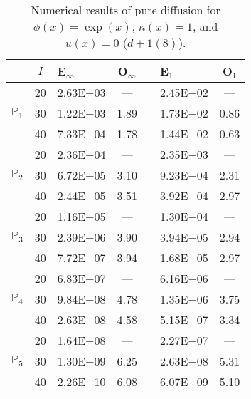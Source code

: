 \begin{table}[H]
\centering
\caption{Numerical results of pure diffusion for $\phi(x)=\exp(x)$, $\kappa(x)=1$, and $u(x)=0$ ($d+1(8)$).}
\begin{tabular}{@{}l c l c c l c@{}}
\toprule
 & $I$ & E$_{\infty}$ & O$_{\infty}$ && E$_1$ & O$_1$\\
\midrule
\multirow{3}{*}{$\mathbb{P}_{1}$}
 & 20 & 2.63E$-$03 & --- && 2.45E$-$02 & ---\\
 & 30 & 1.22E$-$03 & 1.89 && 1.73E$-$02 & 0.86\\
 & 40 & 7.33E$-$04 & 1.78 && 1.44E$-$02 & 0.63\\
\midrule
\multirow{3}{*}{$\mathbb{P}_{2}$}
 & 20 & 2.36E$-$04 & --- && 2.35E$-$03 & ---\\
 & 30 & 6.72E$-$05 & 3.10 && 9.23E$-$04 & 2.31\\
 & 40 & 2.44E$-$05 & 3.51 && 3.92E$-$04 & 2.97\\
\midrule
\multirow{3}{*}{$\mathbb{P}_{3}$}
 & 20 & 1.16E$-$05 & --- && 1.30E$-$04 & ---\\
 & 30 & 2.39E$-$06 & 3.90 && 3.94E$-$05 & 2.94\\
 & 40 & 7.72E$-$07 & 3.94 && 1.68E$-$05 & 2.97\\
\midrule
\multirow{3}{*}{$\mathbb{P}_{4}$}
 & 20 & 6.83E$-$07 & --- && 6.16E$-$06 & ---\\
 & 30 & 9.84E$-$08 & 4.78 && 1.35E$-$06 & 3.75\\
 & 40 & 2.63E$-$08 & 4.58 && 5.15E$-$07 & 3.34\\
\midrule
\multirow{3}{*}{$\mathbb{P}_{5}$}
 & 20 & 1.64E$-$08 & --- && 2.27E$-$07 & ---\\
 & 30 & 1.30E$-$09 & 6.25 && 2.63E$-$08 & 5.31\\
 & 40 & 2.26E$-$10 & 6.08 && 6.07E$-$09 & 5.10\\
\bottomrule
\end{tabular}
\end{table}